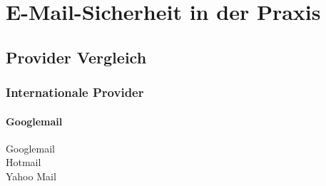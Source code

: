\documentclass  [paper=a4,
				fontsize=12pt,
				listof=totoc,
				bibliography=totoc
				]{scrreprt}
\begin{document}
	\chapter{E-Mail-Sicherheit in der Praxis}
		\section{Provider Vergleich}
			\subsection{Internationale Provider}
			\subsubsection*{Googlemail}
			\label{subsubsec:googlemail}
			\color{darkred}
				Googlemail\\
				Hotmail\\
				Yahoo Mail
			\color{black}
			\pagebreak
\end{document}
